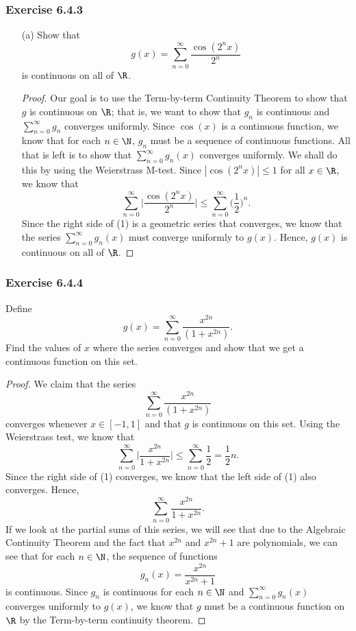 \subsubsection{Exercise 6.4.3} 
\begin{enumerate}
    \item[(a)] Show that 
        \[  g(x) = \sum_{ n=0 }^{ \infty  } \frac{ \cos(2^n x) }{ 2^n }  \]
        is continuous on all of \( \R  \).
        \begin{proof}
            Our goal is to use the Term-by-term Continuity Theorem to show that \( g  \) is continuous on \( \R  \); that is, we want to show that \( g_n  \) is continuous and \( \sum_{ n=0 }^{ \infty  }  g_n  \) converges uniformly. Since \( \cos(x)  \) is a continuous function, we know that for each \( n \in \N  \), \( g_n  \) must be a sequence of continuous functions. All that is left is to show that \( \sum_{ n=0 }^{ \infty  } g_n(x)  \) converges uniformly. We shall do this by using the Weierstrass M-test. Since \( | \cos(2^n x ) | \leq 1  \) for all \( x \in \R  \), we know that \[  \sum_{ n=0 }^{ \infty  } \Big| \frac{ \cos(2^n x ) }{  2^n  }  \Big|  \leq \sum_{ n=0  }^{ \infty  } \Big( \frac{ 1 }{ 2 }  \Big)^n \tag{1}.  \]
            Since the right side of (1) is a geometric series that converges, we know that the series \( \sum_{ n=0 }^{ \infty  } g_n(x)  \) must converge uniformly to \( g(x)  \). Hence, \( g(x) \) is continuous on all of \( \R  \).
        \end{proof}
\end{enumerate}

\subsubsection{Exercise 6.4.4} Define 
\[  g(x) = \sum_{ n=0  }^{ \infty  } \frac{ x^{2n} }{ (1+x^{2n}) }. \]
Find the values of \( x  \) where the series converges and show that we get a continuous function on this set.
\begin{proof}
We claim that the series 
\[  \sum_{ n=0  }^{ \infty  } \frac{ x^{2n} }{  (1 + x^{2n})  } \]
converges whenever \( x \in [-1,1]  \) and that \( g  \) is continuous on this set. Using the Weierstrass test, we know that 
\[  \sum_{ n=0 }^{ \infty  } \Big| \frac{ x^{2n}  }{ 1 + x^{2n} }  \Big| \leq \sum_{ n=0  }^{ \infty  } \frac{ 1 }{ 2 } = \frac{ 1 }{ 2 } n \tag{1}.  \]
Since the right side of (1) converges, we know that the left side of (1) also converges. Hence, 
\[  \sum_{ n=0 }^{ \infty  } \frac{ x^{2n}  }{ 1 + x^{2n}  }. \]
If we look at the partial sums of this series, we will see that due to the Algebraic Continuity Theorem and the fact that \( x^{2n}  \) and \( x^{2n} + 1  \) are polynomials, we can see that for each \(  n \in \N  \), the sequence of functions
\[  g_n(x) = \frac{ x^{2n}  }{ x^{2n} + 1  }  \] is continuous. Since \( g_n  \) is continuous for each \( n \in \N  \) and \(  \sum_{ n=0  }^{  \infty  } g_n(x)  \) converges uniformly to \( g(x ) \), we know that \( g  \) must be a continuous function on \( \R  \) by the Term-by-term continuity theorem.
\end{proof}

